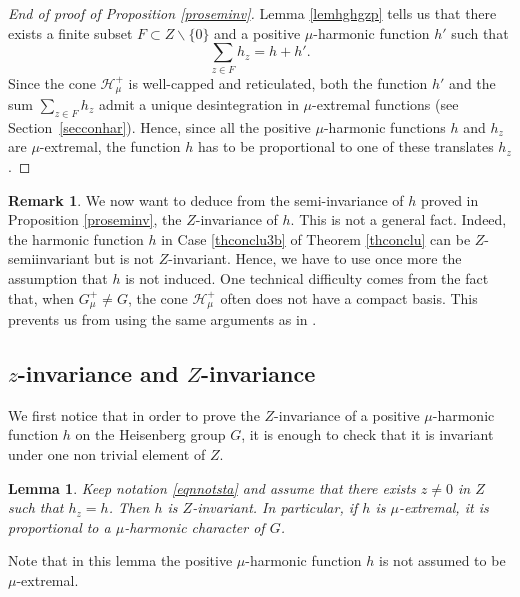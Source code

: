 \documentclass[JEP,XML,SOM,Unicode]{cedram}
\let\mathcal\mathscr
\newtheorem{Lem}[Thm]{Lemma}
\theoremstyle{definition}
\newtheorem{Rem}[Thm]{Remark}
\newcommand{\mc}[1]{\mathcal{ #1}}
\let\bq\relax
\let\eq\relax
\begin{document}
\begin{proof}[End of proof of Proposition \ref{proseminv}]
Lemma \ref{lemhghgzp} tells us that there exists a finite subset $F\subset Z\smallsetminus\{0\}$ and a positive $\mu$-harmonic function $h'$ such that
\[
\sum_{z\in F} h_z=h+h'.
\]
Since the cone $\mc H_\mu^+$ is well-capped and reticulated,
both the function $h'$ and the sum $\sum_{z\in F}h_z$ admit a unique desintegration in $\mu$-extremal functions
(see Section~\ref{secconhar}).
Hence, since all the positive $\mu$-harmonic functions $h$ and $h_z$ are $\mu$-extremal,
the function $h$ has to be proportional to one of these translates $h_z$.
\end{proof}

\begin{Rem}
We now want to deduce from the semi-invariance of $h$
proved in Proposition \ref{proseminv}, the $Z$-invariance of $h$.
This is not a general fact.
Indeed, the harmonic function $h$ in Case \eqref{thconclu3b} of Theorem \ref{thconclu}
can be $Z$-semiinvariant but is not $Z$-invariant.
Hence, we have to use once more the assumption that $h$ is not induced.
One technical difficulty comes from the fact that, when
$G^+_\mu\neq G$, the cone $\mc H_\mu^+$
often does not have a compact basis. This prevents us from using
the same arguments as in \cite{Margulis66}.
\end{Rem}

\subsection{$z$-invariance and $Z$-invariance}
\label{seczinzin}

\bq
We first notice that in order to prove the $Z$-invariance
of a positive $\mu$-harmonic function $h$ on the Heisenberg group $G$, it is enough
to check that it is invariant under one non trivial element of $Z$.
\eq

\begin{Lem}
\label{lemzinzin}
Keep notation \eqref{eqnnotsta} and
assume that there exists $z\neq 0$ in $Z$ such that
$h_z=h$. Then $h$ is $Z$-invariant.
In particular, if $h$ is $\mu$-extremal, it is proportional to a $\mu$-harmonic character of $G$.
\end{Lem}

Note that in this lemma the positive $\mu$-harmonic function $h$
is not assumed to be $\mu$-extremal.
\end{document}

